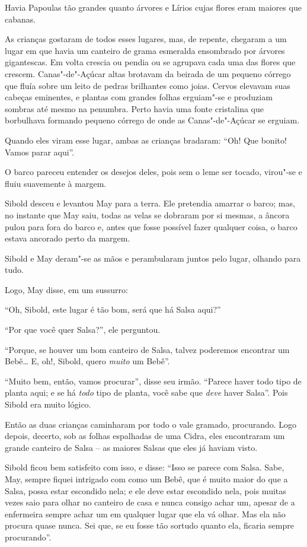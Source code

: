 Havia Papoulas tão grandes quanto árvores e Lírios cujas flores eram
maiores que cabanas.

As crianças gostaram de todos esses lugares, mas, de repente, chegaram a
um lugar em que havia um canteiro de grama esmeralda ensombrado por
árvores gigantescas. Em volta crescia ou pendia ou se agrupava cada uma
das flores que crescem. Canas"-de"-Açúcar altas brotavam da beirada de um
pequeno córrego que fluía sobre um leito de pedras brilhantes como
joias. Cervos elevavam suas cabeças eminentes, e plantas com grandes
folhas erguiam"-se e produziam sombras até mesmo na penumbra. Perto havia
uma fonte cristalina que borbulhava formando pequeno córrego de onde as
Canas"-de"-Açúcar se erguiam.

Quando eles viram esse lugar, ambas as crianças bradaram: ``Oh! Que
bonito! Vamos parar aqui''.

O barco pareceu entender os desejos deles, pois sem o leme ser tocado,
virou"-se e fluiu suavemente à margem.

Sibold desceu e levantou May para a terra. Ele pretendia amarrar o
barco; mas, no instante que May saiu, todas as velas se dobraram por si
mesmas, a âncora pulou para fora do barco e, antes que fosse possível
fazer qualquer coisa, o barco estava ancorado perto da margem.

Sibold e May deram"-se as mãos e perambularam juntos pelo lugar, olhando
para tudo.

Logo, May disse, em um sussurro:

``Oh, Sibold, este lugar é tão bom, será que há Salsa aqui?''

``Por que você quer Salsa?'', ele perguntou.

``Porque, se houver um bom canteiro de Salsa, talvez poderemos encontrar
um Bebê… E, oh!, Sibold, quero \emph{muito} um Bebê''.

``Muito bem, então, vamos procurar'', disse seu irmão. ``Parece haver
todo tipo de planta aqui; e se há \emph{todo} tipo de planta, você sabe
que \emph{deve} haver Salsa''. Pois Sibold era muito lógico.

Então as duas crianças caminharam por todo o vale gramado, procurando.
Logo depois, decerto, sob as folhas espalhadas de uma Cidra, eles
encontraram um grande canteiro de Salsa -- as maiores Salsas que eles já
haviam visto.

Sibold ficou bem satisfeito com isso, e disse: ``Isso se parece com
Salsa. Sabe, May, sempre fiquei intrigado com como um Bebê, que é muito
maior do que a Salsa, possa estar escondido nela; e ele deve estar
escondido nela, pois muitas vezes saio para olhar no canteiro de casa e
nunca consigo achar um, apesar de a enfermeira sempre achar um em
qualquer lugar que ela vá olhar. Mas ela não procura quase nunca. Sei
que, se eu fosse tão sortudo quanto ela, ficaria sempre procurando''.

